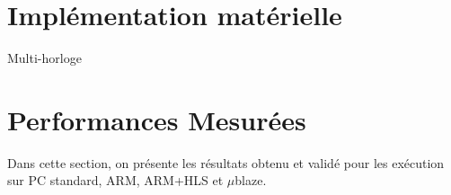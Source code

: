\documentclass[12pt,a4paper]{article}
\begin{document}
\section{Implémentation matérielle}





\label{SmartClock}
Multi-horloge

\section{Performances Mesurées}
Dans cette section, on présente les résultats obtenu et validé pour les exécution sur PC standard, ARM, ARM+HLS et $\mu$blaze.
\end{document}
